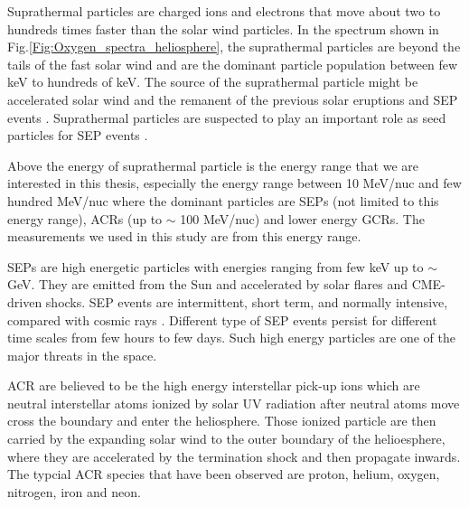 
Suprathermal particles are charged ions and electrons that move about two to hundreds times faster than the solar wind particles. In the spectrum shown in Fig.\ref{Fig:Oxygen_spectra_heliosphere}, the suprathermal particles are beyond the tails of the fast solar wind and are the dominant particle population between few keV to hundreds of keV. The source of the suprathermal particle might be accelerated solar wind and the remanent of the previous solar eruptions and \ac{SEP} events \citep{Gloeckler1995SSRv}. Suprathermal particles are suspected to play an important role as seed particles for \ac{SEP} events \citep{Kahler2019ApJ}.

Above the energy of suprathermal particle is the energy range that we are interested in this thesis, especially the energy range between 10 MeV/nuc and few hundred MeV/nuc where the dominant particles are \acp{SEP} (not limited to this energy range), \acp{ACR} (up to $\sim$ 100 MeV/nuc) and lower energy \acp{GCR}. The measurements we used in this study are from this energy range.

\acp{SEP} are high energetic particles with energies ranging from few keV up to $\sim$ GeV. They are emitted from the Sun and accelerated by solar flares and \ac{CME}-driven shocks. \acs{SEP} events are intermittent, short term, and normally intensive, compared with cosmic rays \citep{Reames1999}. Different type of \acs{SEP} events persist for different time scales from few hours to few days. Such high energy particles are one of the major threats in the space.

\acs{ACR} are believed to be the high energy interstellar pick-up ions \citep{Giacalone2022SSRv} which are neutral interstellar atoms ionized by solar UV radiation after neutral atoms move cross the boundary and enter the heliosphere. Those ionized particle are then carried by the expanding solar wind to the outer boundary of the helioesphere, where they are accelerated by the termination shock and then propagate inwards. The typcial \ac{ACR} species that have been observed are proton, helium, oxygen, nitrogen, iron and neon. 

